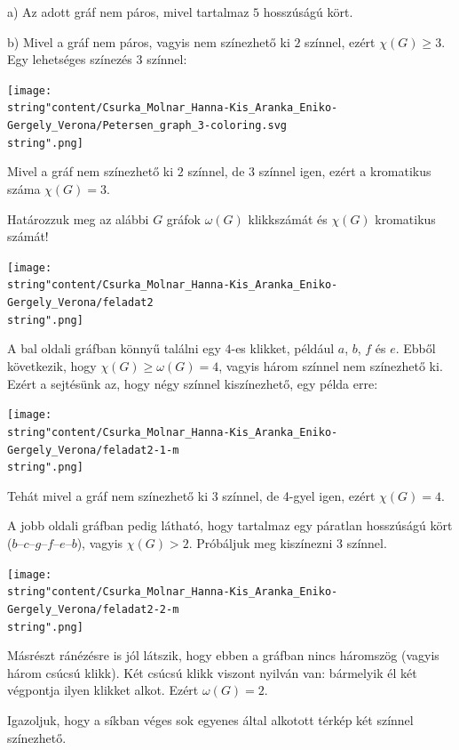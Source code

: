 \begin{solution}
	a) Az adott gráf nem páros, mivel tartalmaz $5$ hosszúságú
	kört.
	
	b) Mivel a gráf nem páros, vagyis nem színezhető ki $2$ színnel,
	ezért $\chi(G)\geq3$. Egy lehetséges színezés $3$ színnel:
	\begin{center}
		\texttt{[image: \\string"content/Csurka\_Molnar\_Hanna-Kis\_Aranka\_Eniko-Gergely\_Verona/Petersen\_graph\_3-coloring.svg\\string".png]} 
		\par\end{center}
	Mivel a gráf nem színezhető ki $2$ színnel, de $3$ színnel igen,
	ezért a kromatikus száma $\chi(G)=3$. 
\end{solution}
\begin{problem}
	Határozzuk meg az alábbi $G$ gráfok $\omega(G)$ klikkszámát
	és $\chi(G)$ kromatikus számát! 
	\begin{center}
		\texttt{[image: \\string"content/Csurka\_Molnar\_Hanna-Kis\_Aranka\_Eniko-Gergely\_Verona/feladat2\\string".png]} 
		\par\end{center}
\end{problem}

\begin{solution}
	A bal oldali gráfban könnyű találni egy $4$-es klikket,
	például $a$, $b$, $f$ és $e$. Ebből következik, hogy $\chi(G)\geq\omega(G)=4$,
	vagyis három színnel nem színezhető ki. Ezért a sejtésünk az, hogy
	négy színnel kiszínezhető, egy példa erre:
	\begin{center}
		\texttt{[image: \\string"content/Csurka\_Molnar\_Hanna-Kis\_Aranka\_Eniko-Gergely\_Verona/feladat2-1-m\\string".png]} 
		\par\end{center}
	Tehát mivel a gráf nem színezhető ki 3 színnel, de 4-gyel igen, ezért
	$\chi(G)=4$.
	
	A jobb oldali gráfban pedig látható, hogy tartalmaz egy páratlan hosszúságú
	kört ($b$--$c$--$g$--$f$--$e$--$b$), vagyis $\chi(G)>2$.
	Próbáljuk meg kiszínezni 3 színnel.
	\begin{center}
		\texttt{[image: \\string"content/Csurka\_Molnar\_Hanna-Kis\_Aranka\_Eniko-Gergely\_Verona/feladat2-2-m\\string".png]} 
		\par\end{center}
	Másrészt ránézésre is jól látszik, hogy ebben a gráfban nincs háromszög
	(vagyis három csúcsú klikk). Két csúcsú klikk viszont nyilván van:
	bármelyik él két végpontja ilyen klikket alkot. Ezért $\omega(G)=2$. 
\end{solution}
\begin{problem}
	Igazoljuk, hogy a síkban véges sok egyenes által alkotott
	térkép két színnel színezhető. 
\end{problem}

